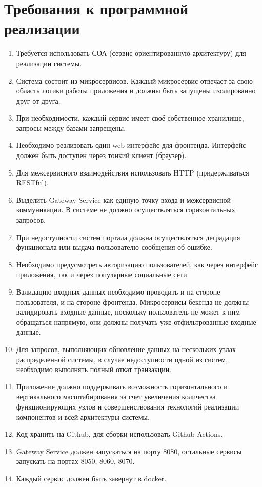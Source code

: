 \section*{Требования к программной реализации}
\begin{enumerate}
	\item Требуется использовать СОА (сервис-ориентированную архитектуру) для реализации системы.
	
	\item Система состоит из микросервисов. Каждый микросервис отвечает за свою область логики работы приложения и должны быть запущены изолированно друг от друга.
	
	\item При необходимости, каждый сервис имеет своё собственное хранилище,  запросы между базами запрещены.
	
	\item Необходимо  реализовать  один  web-интерфейс  для  фронтенда.  Интерфейс  должен  быть  доступен  через  тонкий  клиент (браузер).
	
	\item Для межсервисного взаимодействия использовать HTTP (придерживаться RESTful).
	
	\item Выделить Gateway Service как единую точку входа и межсервисной коммуникации. В системе не должно осуществляться горизонтальных запросов.
	
	\item При недоступности систем портала должна осуществляться деградация	функционала или выдача пользователю сообщения об ошибке.
	
	\item Необходимо предусмотреть авторизацию пользователей, как через интерфейс приложения, так и через популярные социальные сети.
	
	\item Валидацию входных данных необходимо проводить и на стороне  пользователя,  и  на  стороне  фронтенда. Микросервисы бекенда не должны валидировать входные данные, поскольку пользователь не может к ним обращаться напрямую, они должны получать уже отфильтрованные входные данные.
	
	\item Для запросов, выполняющих обновление данных на нескольких узлах распределенной системы, в случае недоступности одной из систем, необходимо выполнять полный откат транзакции.
	
	\item Приложение должно поддерживать возможность горизонтального и вертикального масштабирования за счет увеличения количества функционирующих узлов и совершенствования технологий реализации компонентов и всей
	архитектуры системы.
	
	\item Код хранить на Github, для сборки использовать Github Actions.
	
	\item Gateway Service должен запускаться на порту 8080, остальные сервисы запускать на портах 8050, 8060, 8070.
	
	\item Каждый сервис должен быть завернут в docker.
\end{enumerate}

